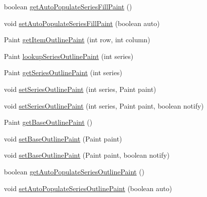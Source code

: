 \begin{DoxyCompactItemize}
\item 
boolean \mbox{\hyperlink{classorg_1_1jfree_1_1chart_1_1renderer_1_1_abstract_renderer_a8f99b356760b4aab2603c011346359d1}{get\+Auto\+Populate\+Series\+Fill\+Paint}} ()
\item 
void \mbox{\hyperlink{classorg_1_1jfree_1_1chart_1_1renderer_1_1_abstract_renderer_a93616ea6bf29500cc4b9d632f676c204}{set\+Auto\+Populate\+Series\+Fill\+Paint}} (boolean auto)
\item 
Paint \mbox{\hyperlink{classorg_1_1jfree_1_1chart_1_1renderer_1_1_abstract_renderer_a854b3a3d312b4cf996de5a5494044f5a}{get\+Item\+Outline\+Paint}} (int row, int column)
\item 
Paint \mbox{\hyperlink{classorg_1_1jfree_1_1chart_1_1renderer_1_1_abstract_renderer_a1e691b145468f90219f5883f146664f5}{lookup\+Series\+Outline\+Paint}} (int series)
\item 
Paint \mbox{\hyperlink{classorg_1_1jfree_1_1chart_1_1renderer_1_1_abstract_renderer_a984ad77afa8a897e282eb6c8d91f0f25}{get\+Series\+Outline\+Paint}} (int series)
\item 
void \mbox{\hyperlink{classorg_1_1jfree_1_1chart_1_1renderer_1_1_abstract_renderer_a6d27857d69d54d10b75734d830f52488}{set\+Series\+Outline\+Paint}} (int series, Paint paint)
\item 
void \mbox{\hyperlink{classorg_1_1jfree_1_1chart_1_1renderer_1_1_abstract_renderer_a2ca55e3eea1cb35db72fa0c9688fca84}{set\+Series\+Outline\+Paint}} (int series, Paint paint, boolean notify)
\item 
Paint \mbox{\hyperlink{classorg_1_1jfree_1_1chart_1_1renderer_1_1_abstract_renderer_a431b943b37813034936dff4c167deb30}{get\+Base\+Outline\+Paint}} ()
\item 
void \mbox{\hyperlink{classorg_1_1jfree_1_1chart_1_1renderer_1_1_abstract_renderer_ab1a850a60c44c51d4cbaa83c294b2f86}{set\+Base\+Outline\+Paint}} (Paint paint)
\item 
void \mbox{\hyperlink{classorg_1_1jfree_1_1chart_1_1renderer_1_1_abstract_renderer_a3132fccedf5a5e1c07a003477aaf1109}{set\+Base\+Outline\+Paint}} (Paint paint, boolean notify)
\item 
boolean \mbox{\hyperlink{classorg_1_1jfree_1_1chart_1_1renderer_1_1_abstract_renderer_ab1e91f057f52655aafe373c454e5f828}{get\+Auto\+Populate\+Series\+Outline\+Paint}} ()
\item 
void \mbox{\hyperlink{classorg_1_1jfree_1_1chart_1_1renderer_1_1_abstract_renderer_a8874e4c097e5fe9779d3476c55b17a99}{set\+Auto\+Populate\+Series\+Outline\+Paint}} (boolean auto)

\end{DoxyCompactItemize}

